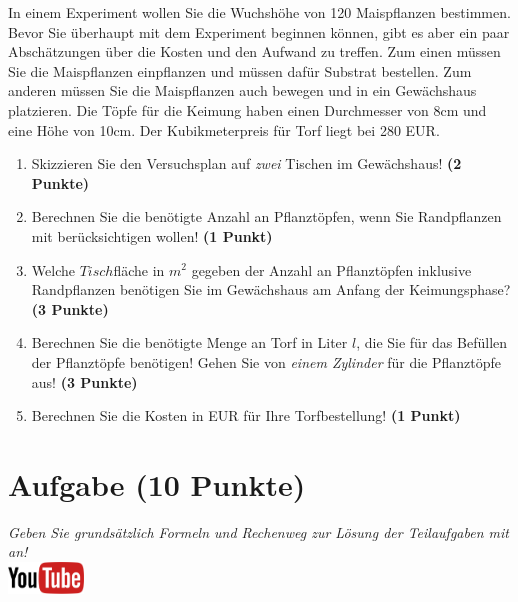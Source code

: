 \documentclass[a4paper, 9pt]{scrartcl}\usepackage[]{graphicx}\usepackage[]{xcolor}
\begin{document}
In einem Experiment wollen Sie die Wuchsh{\"o}he von 120
Maispflanzen bestimmen. Bevor Sie {\"u}berhaupt mit dem Experiment beginnen
k{\"o}nnen, gibt es aber ein paar Absch{\"a}tzungen {\"u}ber die Kosten und den Aufwand
zu treffen. Zum einen m{\"u}ssen Sie die Maispflanzen einpflanzen und m{\"u}ssen
daf{\"u}r Substrat bestellen. Zum anderen m{\"u}ssen Sie die Maispflanzen auch
bewegen und in ein Gew{\"a}chshaus platzieren. Die T{\"o}pfe f{\"u}r die Keimung haben
einen Durchmesser von 8cm und eine H{\"o}he von 10cm. Der
Kubikmeterpreis f{\"u}r Torf liegt bei 280 EUR.

\begin{enumerate}
\item Skizzieren Sie den Versuchsplan auf \textit{zwei} Tischen im
  Gew{\"a}chshaus! \textbf{(2 Punkte)}
\item Berechnen Sie die ben{\"o}tigte Anzahl an Pflanzt{\"o}pfen, wenn Sie
  Randpflanzen mit ber{\"u}cksichtigen wollen! \textbf{(1 Punkt)}
\item Welche $Tisch$fl{\"a}che in $m^2$ gegeben der Anzahl an
  Pflanzt{\"o}pfen inklusive Randpflanzen ben{\"o}tigen Sie im Gew{\"a}chshaus am
  Anfang der Keimungsphase?  \textbf{(3 Punkte)}
\item Berechnen Sie die ben{\"o}tigte Menge an Torf in Liter $l$, die Sie f{\"u}r
  das Bef{\"u}llen der Pflanzt{\"o}pfe ben{\"o}tigen! Gehen Sie von \textit{einem
    Zylinder} f{\"u}r die Pflanzt{\"o}pfe aus!  \textbf{(3 Punkte)}
\item Berechnen Sie die Kosten in EUR f{\"u}r Ihre Torfbestellung! \textbf{(1
    Punkt)}
\end{enumerate}



 
\clearpage

\section{Aufgabe \hfill (10 Punkte)}

\textit{Geben Sie grunds{\"a}tzlich Formeln und Rechenweg zur L{\"o}sung der
  Teilaufgaben mit an!} \\[1Ex]

\hfill\href{https://youtu.be/aBxLkdF-c4M}{\includegraphics[width =
  2cm]{img/youtube}} %
\hspace{2Ex}
\end{document}

